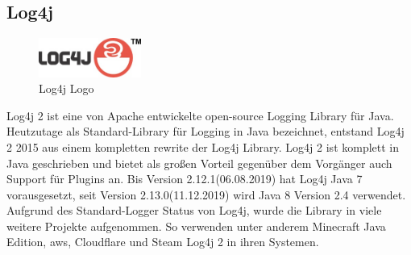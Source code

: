 
\subsection{Log4j}\label{subsec:log4j}
\begin{figure}
    \begin{center}
        \includegraphics[width=0.3\textwidth]{images/log4j}
    \end{center}
    \caption{Log4j Logo}
\end{figure}
Log4j 2 ist eine von Apache entwickelte open-source Logging Library für Java.
Heutzutage als Standard-Library für Logging in Java bezeichnet, entstand Log4j 2 2015 aus einem kompletten rewrite der Log4j Library.
Log4j 2 ist komplett in Java geschrieben und bietet als großen Vorteil gegenüber dem Vorgänger auch Support für Plugins an.
Bis Version 2.12.1(06.08.2019) hat Log4j Java 7 vorausgesetzt, seit Version 2.13.0(11.12.2019) wird Java 8 Version 2.4 verwendet.
Aufgrund des Standard-Logger Status von Log4j, wurde die Library in viele weitere Projekte aufgenommen.
So verwenden unter anderem Minecraft Java Edition, \gls{aws}, Cloudflare und Steam Log4j 2 in ihren Systemen.
